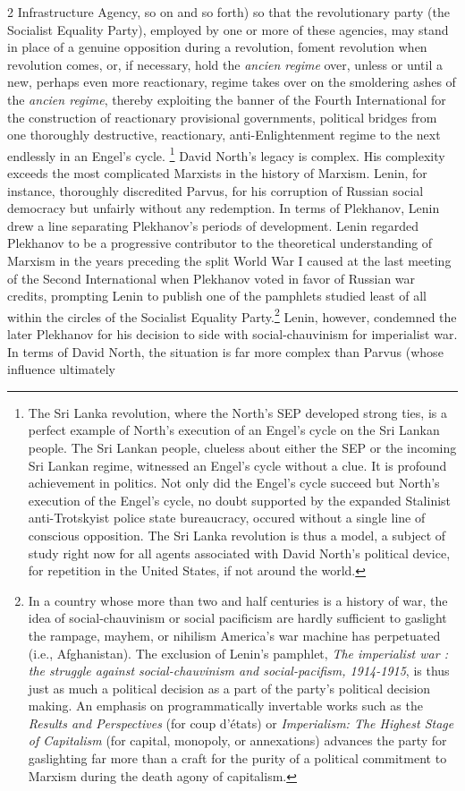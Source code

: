 \documentclass[10pt,a4paper,twoside]{article} %
\begin{document}
\begin{multicols}{2}
Infrastructure Agency, so on and so forth) so that the revolutionary party (the Socialist Equality Party), employed by one or more of these agencies, may stand in place of a genuine opposition during a revolution, foment revolution when revolution comes, or, if necessary, hold the \emph{ancien regime} over, unless or until a new, perhaps even more reactionary, regime takes over on the smoldering ashes of the \emph{ancien regime}, thereby exploiting the banner of the Fourth International for the construction of reactionary provisional governments, political bridges from one thoroughly destructive, reactionary, anti-Enlightenment regime to the next endlessly in an Engel's cycle. \footnote{The Sri Lanka revolution, where the North's SEP developed strong ties, is a perfect example of North's execution of an Engel's cycle on the Sri Lankan people. The Sri Lankan people, clueless about either the SEP or the incoming Sri Lankan regime, witnessed an Engel's cycle without a clue. It is profound achievement in politics. Not only did the Engel's cycle succeed but North's execution of the Engel's cycle, no doubt supported by the expanded Stalinist anti-Trotskyist police state bureaucracy, occured without a single line of conscious opposition. The Sri Lanka revolution is thus a model, a subject of study right now for all agents associated with David North's political device, for repetition in the United States, if not around the world.} \newline \indent David North's legacy is complex. His complexity exceeds the most complicated Marxists in the history of Marxism. Lenin, for instance, thoroughly discredited Parvus, for his corruption of Russian social democracy but unfairly without any redemption. In terms of Plekhanov, Lenin drew a line separating Plekhanov's periods of development. Lenin regarded Plekhanov to be a progressive contributor to the theoretical understanding of Marxism in the years preceding the split World War I caused at the last meeting of the Second International when Plekhanov voted in favor of Russian war credits, prompting Lenin to publish one of the pamphlets studied least of all within the circles of the Socialist Equality Party.\footnote{In a country whose more than two and half centuries is a history of war, the idea of social-chauvinism or social pacificism are hardly sufficient to gaslight the rampage, mayhem, or nihilism America's war machine has perpetuated (i.e., Afghanistan). The exclusion of Lenin's pamphlet, \emph{The imperialist war : the struggle against social-chauvinism and social-pacifism, 1914-1915}, is thus just as much a political decision as a part of the party's political decision making. An emphasis on programmatically invertable works such as the \emph{Results and Perspectives} (for \textfrench{coup d'états}) or \emph{Imperialism: The Highest Stage of Capitalism} (for capital, monopoly, or annexations) advances the party for gaslighting far more than a craft for the purity of a political commitment to Marxism during the death agony of capitalism.} Lenin, however, condemned the later Plekhanov for his decision to side with social-chauvinism for imperialist war. In terms of David North, the situation is far more complex than Parvus (whose influence ultimately 
\end{multicols}
\end{document}
